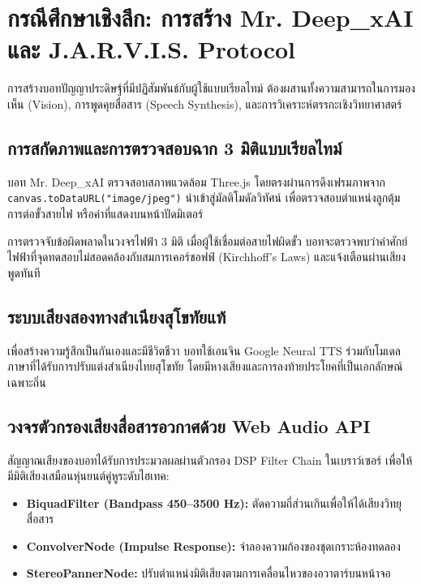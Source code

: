 \chapter{กรณีศึกษาเชิงลึก: การสร้าง Mr. Deep\_xAI และ J.A.R.V.I.S. Protocol}

การสร้างบอทปัญญาประดิษฐ์ที่มีปฏิสัมพันธ์กับผู้ใช้แบบเรียลไทม์ ต้องผสานทั้งความสามารถในการมองเห็น (Vision), การพูดคุยสื่อสาร (Speech Synthesis), และการวิเคราะห์ตรรกะเชิงวิทยาศาสตร์

\section{การสกัดภาพและการตรวจสอบฉาก 3 มิติแบบเรียลไทม์}

บอท Mr. Deep\_xAI ตรวจสอบสภาพแวดล้อม Three.js โดยตรงผ่านการดึงเฟรมภาพจาก \texttt{canvas.toDataURL("image/jpeg")} นำเข้าสู่มัลติโมดัลวิทัศน์ เพื่อตรวจสอบตำแหน่งลูกตุ้ม การต่อขั้วสายไฟ หรือค่าที่แสดงบนหน้าปัดมิเตอร์

\begin{teachingplan}{การตรวจจับข้อผิดพลาดในวงจรไฟฟ้า 3 มิติ}
เมื่อผู้ใช้เชื่อมต่อสายไฟผิดขั้ว บอทจะตรวจพบว่าค่าศักย์ไฟฟ้าที่จุดทดสอบไม่สอดคล้องกับสมการเคอร์ชอฟฟ์ (Kirchhoff's Laws) และแจ้งเตือนผ่านเสียงพูดทันที
\end{teachingplan}

\section{ระบบเสียงสองทางสำเนียงสุโขทัยแท้}

เพื่อสร้างความรู้สึกเป็นกันเองและมีชีวิตชีวา บอทใช้เอนจิน Google Neural TTS ร่วมกับโมเดลภาษาที่ได้รับการปรับแต่งสำเนียงไทยสุโขทัย โดยมีหางเสียงและการลงท้ายประโยคที่เป็นเอกลักษณ์เฉพาะถิ่น

\section{วงจรตัวกรองเสียงสื่อสารอวกาศด้วย Web Audio API}

สัญญาณเสียงของบอทได้รับการประมวลผลผ่านตัวกรอง DSP Filter Chain ในเบราว์เซอร์ เพื่อให้มีมิติเสียงเสมือนหุ่นยนต์คู่หูระดับไฮเทค:

\begin{itemize}
    \item \textbf{BiquadFilter (Bandpass 450--3500 Hz):} ตัดความถี่ส่วนเกินเพื่อให้ได้เสียงวิทยุสื่อสาร
    \item \textbf{ConvolverNode (Impulse Response):} จำลองความก้องของชุดเกราะห้องทดลอง
    \item \textbf{StereoPannerNode:} ปรับตำแหน่งมิติเสียงตามการเคลื่อนไหวของอวาตาร์บนหน้าจอ
\end{itemize}

